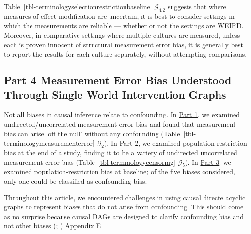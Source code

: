 \documentclass[
  single column]{article}
\begin{document}
Table~\ref{tbl-terminologyselectionrestrictionbaseline}
\(\mathcal{G}_{4.2}\) suggests that where measures of effect
modification are uncertain, it is best to consider settings in which the
measurements are reliable --- whether or not the settings are WEIRD.
Moreover, in comparative settings where multiple cultures are measured,
unless each is proven innocent of structural measurement error bias, it
is generally best to report the results for each culture separately,
without attempting comparisons.

\subsection{Part 4 Measurement Error Bias Understood Through Single
World Intervention Graphs}\label{id-sec-4}

Not all biases in causal inference relate to confounding. In
\hyperref[id-sec-1]{Part 1}, we examined undirected/uncorrelated
measurement error bias and found that measurement bias can arise `off
the null' without any confounding
(Table~\ref{tbl-terminologymeasurementerror} \(\mathcal{G}_2\)). In
\hyperref[id-sec-2]{Part 2}, we examined population-restriction bias at
the end of a study, finding it to be a variety of undirected
uncorrelated measurement error bias
(Table~\ref{tbl-terminologycensoring} \(\mathcal{G}_5\)). In
\hyperref[id-sec-3]{Part 3}, we examined population-restriction bias at
baseline; of the five biases considered, only one could be classified as
confounding bias.

Throughout this article, we encountered challenges in using causal
directe acyclic graphs to represent biases that do not arise from
confounding. This should come as no surprise because causal DAGs are
designed to clarify confounding bias and not other biases
(;
) \hyperref[id-app_E]{Appendix E}
\end{document}
